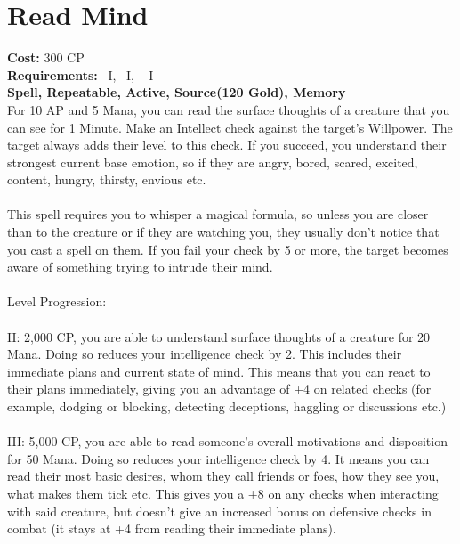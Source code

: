 \section{Read Mind}\label{spell:readMind}
\textbf{Cost:} 300 CP\\
\textbf{Requirements:}~ I,~ I, ~ I\\
\textbf{Spell, Repeatable, Active, Source(120 Gold), Memory}\\
For 10 AP and 5 Mana, you can read the surface thoughts of a creature that you can see for 1 Minute.
Make an Intellect check against the target's Willpower.
The target always adds their level to this check.
If you succeed, you understand their strongest current base emotion, so if they are angry, bored, scared, excited, content, hungry, thirsty, envious etc.\\
\\
This spell requires you to whisper a magical formula, so unless you are closer than  to the creature or if they are watching you, they usually don't notice that you cast a spell on them.
If you fail your check by 5 or more, the target becomes aware of something trying to intrude their mind.\\
\\
Level Progression:\\
\\
II: 2,000 CP, you are able to understand surface thoughts of a creature for 20 Mana.
Doing so reduces your intelligence check by 2.
This includes their immediate plans and current state of mind.
This means that you can react to their plans immediately, giving you an advantage of +4 on related checks (for example, dodging or blocking, detecting deceptions, haggling or discussions etc.)\\
\\
III: 5,000 CP, you are able to read someone's overall motivations and disposition for 50 Mana.
Doing so reduces your intelligence check by 4.
It means you can read their most basic desires, whom they call friends or foes, how they see you, what makes them tick etc.
This gives you a +8 on any checks when interacting with said creature, but doesn't give an increased bonus on defensive checks in combat (it stays at +4 from reading their immediate plans).\\